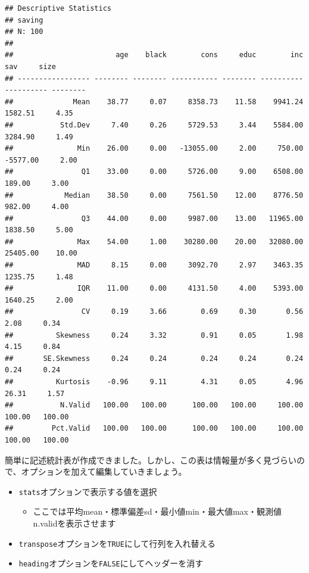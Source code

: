 \documentclass[]{book}
\providecommand{\tightlist}{%
  \setlength{\itemsep}{0pt}\setlength{\parskip}{0pt}}
\begin{document}
\begin{verbatim}
## Descriptive Statistics  
## saving  
## N: 100  
## 
##                        age    black        cons     educ        inc        sav     size
## ----------------- -------- -------- ----------- -------- ---------- ---------- --------
##              Mean    38.77     0.07     8358.73    11.58    9941.24    1582.51     4.35
##           Std.Dev     7.40     0.26     5729.53     3.44    5584.00    3284.90     1.49
##               Min    26.00     0.00   -13055.00     2.00     750.00   -5577.00     2.00
##                Q1    33.00     0.00     5726.00     9.00    6508.00     189.00     3.00
##            Median    38.50     0.00     7561.50    12.00    8776.50     982.00     4.00
##                Q3    44.00     0.00     9987.00    13.00   11965.00    1838.50     5.00
##               Max    54.00     1.00    30280.00    20.00   32080.00   25405.00    10.00
##               MAD     8.15     0.00     3092.70     2.97    3463.35    1235.75     1.48
##               IQR    11.00     0.00     4131.50     4.00    5393.00    1640.25     2.00
##                CV     0.19     3.66        0.69     0.30       0.56       2.08     0.34
##          Skewness     0.24     3.32        0.91     0.05       1.98       4.15     0.84
##       SE.Skewness     0.24     0.24        0.24     0.24       0.24       0.24     0.24
##          Kurtosis    -0.96     9.11        4.31     0.05       4.96      26.31     1.57
##           N.Valid   100.00   100.00      100.00   100.00     100.00     100.00   100.00
##         Pct.Valid   100.00   100.00      100.00   100.00     100.00     100.00   100.00
\end{verbatim}

簡単に記述統計表が作成できました。しかし、この表は情報量が多く見づらいので、オプションを加えて編集していきましょう。

\begin{itemize}
\tightlist
\item
  \texttt{stats}オプションで表示する値を選択

  \begin{itemize}
  \tightlist
  \item
    ここでは平均mean・標準偏差sd・最小値min・最大値max・観測値n.validを表示させます
  \end{itemize}
\item
  \texttt{transpose}オプションを\texttt{TRUE}にして行列を入れ替える
\item
  \texttt{heading}オプションを\texttt{FALSE}にしてヘッダーを消す
\end{itemize}
\end{document}
